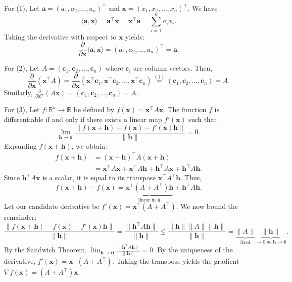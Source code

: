 \documentclass[12pt]{article}
\begin{document}
\begin{pfbox}
For (1),
Let $\mathbf{a} = (a_1, a_2, \dots, a_n)^\top$ and $\mathbf{x} = (x_1, x_2, \dots, x_n)^\top$. We have
$$ \langle \mathbf{a}, \mathbf{x} \rangle = \mathbf{a}^\top \mathbf{x} = \mathbf{x}^\top \mathbf{a} = \sum_{i=1}^n a_i x_i. $$
Taking the derivative with respect to $\mathbf{x}$ yields:
$$ \frac{\partial}{\partial \mathbf{x}} \langle \mathbf{a}, \mathbf{x} \rangle = (a_1, a_2, \dots, a_n)^\top = \mathbf{a}. $$

For (2),
Let $A = (\mathbf{c}_1, \mathbf{c}_2, \dots, \mathbf{c}_n)$ where $\mathbf{c}_i$ are column vectors. Then,
$$ \frac{\partial}{\partial \mathbf{x}} (\mathbf{x}^\top A) = \frac{\partial}{\partial \mathbf{x}} (\mathbf{x}^\top \mathbf{c}_1, \mathbf{x}^\top \mathbf{c}_2, \dots, \mathbf{x}^\top \mathbf{c}_n) \stackrel{(1)}{=} (\mathbf{c}_1, \mathbf{c}_2, \dots, \mathbf{c}_n) = A. $$
Similarly, $\frac{\partial}{\partial \mathbf{x}^\top} (A\mathbf{x}) = (\mathbf{c}_1, \mathbf{c}_2, \dots, \mathbf{c}_n) = A$.

For (3),
Let $f: \mathbb{R}^n \to \mathbb{R}$ be defined by $f(\mathbf{x}) = \mathbf{x}^\top A \mathbf{x}$. 
The function $f$ is differentiable if and only if there exists a linear map $f'(\mathbf{x})$ such that
$$ \lim_{\mathbf{h} \to \mathbf{0}} \frac{\|f(\mathbf{x} + \mathbf{h}) - f(\mathbf{x}) - f'(\mathbf{x})\mathbf{h}\|}{\|\mathbf{h}\|} = 0. $$
Expanding $f(\mathbf{x} + \mathbf{h})$, we obtain:
\begin{align*}
    f(\mathbf{x} + \mathbf{h}) &= (\mathbf{x} + \mathbf{h})^\top A (\mathbf{x} + \mathbf{h}) \\
    &= \mathbf{x}^\top A \mathbf{x} + \mathbf{x}^\top A \mathbf{h} + \mathbf{h}^\top A \mathbf{x} + \mathbf{h}^\top A \mathbf{h}.
\end{align*}
Since $\mathbf{h}^\top A \mathbf{x}$ is a scalar, it is equal to its transpose $\mathbf{x}^\top A^\top \mathbf{h}$. Thus,
$$ f(\mathbf{x} + \mathbf{h}) - f(\mathbf{x}) = \underbrace{\mathbf{x}^\top(A + A^\top)\mathbf{h}}_{\text{linear in } \mathbf{h}} + \mathbf{h}^\top A \mathbf{h}. $$
Let our candidate derivative be $f'(\mathbf{x}) = \mathbf{x}^\top(A + A^\top)$. We now bound the remainder:
$$ \frac{\|f(\mathbf{x} + \mathbf{h}) - f(\mathbf{x}) - f'(\mathbf{x})\mathbf{h}\|}{\|\mathbf{h}\|} = \frac{\|\mathbf{h}^\top A \mathbf{h}\|}{\|\mathbf{h}\|} \le \frac{\|\mathbf{h}\| \|A\| \|\mathbf{h}\|}{\|\mathbf{h}\|} = \underbrace{\|A\|}_{\text{fixed}} \underbrace{\|\mathbf{h}\|}_{\to 0 \text{ as } \mathbf{h} \to \mathbf{0}}. $$
By the Sandwich Theorem, $\lim_{\mathbf{h} \to \mathbf{0}} \frac{\|\mathbf{h}^\top A \mathbf{h}\|}{\|\mathbf{h}\|} = 0$. 
By the uniqueness of the derivative, $f'(\mathbf{x}) = \mathbf{x}^\top(A + A^\top)$. Taking the transpose yields the gradient $\nabla f(\mathbf{x}) = (A + A^\top)\mathbf{x}$.\\


\end{pfbox}
\end{document}
